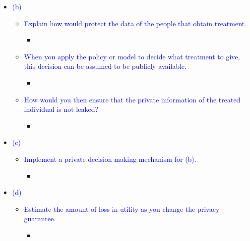 \begin{itemize}
\begin{itemize}
                \begin{itemize}
                    \item 
                \end{itemize}
        \end{itemize}
    \item \textcolor{blue}{(b)}
        \begin{itemize}
            \item \textcolor{blue}{Explain how would protect the data of the people that obtain treatment.}
                \begin{itemize}
                    \item 
                \end{itemize}
            \item \textcolor{blue}{When you apply the policy or model to decide what treatment to give, this decision can be assumed to be publicly available.}
                \begin{itemize}
                    \item 
                \end{itemize}
            \item \textcolor{blue}{How would you then ensure that the private information of the treated individual is not leaked?}
                \begin{itemize}
                    \item 
                \end{itemize}
        \end{itemize}
    \item \textcolor{blue}{(c)}
        \begin{itemize}
            \item \textcolor{blue}{Implement a private decision making mechanism for (b).}
                \begin{itemize}
                    \item 
                \end{itemize}
        \end{itemize}
    \item \textcolor{blue}{(d)}
        \begin{itemize}
            \item \textcolor{blue}{Estimate the amount of loss in utility as you change the privacy guarantee.}
                \begin{itemize}
                    \item 
                \end{itemize}
        \end{itemize}
\end{itemize}